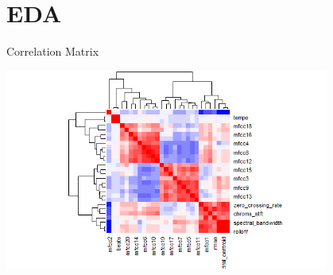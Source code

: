 \documentclass[11pt]{beamer}
\begin{document}
\section{EDA}
\begin{frame}{Correlation Matrix}
\begin{center}
    \includegraphics[width=0.8\textwidth]{correlation_matrix.png}
\end{center}
\end{frame}
\end{document}
